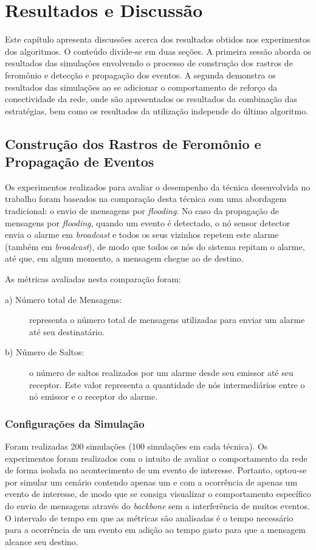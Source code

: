 \chapter{Resultados e Discussão}
Este capítulo apresenta discussões acerca dos resultados obtidos nos experimentos dos algoritmos. O conteúdo divide-se em duas seções. A primeira sessão aborda os resultados das simulações envolvendo o processo de construção dos rastros de feromônio e detecção e propagação dos eventos. A segunda demonstra os resultados das simulações ao se adicionar o comportamento de reforço da conectividade da rede, onde são apresentados os resultados da combinação das estratégias, bem como os resultados da utilização independe do último algoritmo.

\section{Construção dos Rastros de Feromônio e Propagação de Eventos}
Os experimentos realizados para avaliar o desempenho da técnica desenvolvida no trabalho foram baseados na comparação desta técnica com uma abordagem tradicional: o envio de mensagens por \emph{flooding}. No caso da propagação de mensagens por \emph{flooding}, quando um evento é detectado, o nó sensor detector envia o alarme em \emph{broadcast} e todos os seus vizinhos repetem este alarme (também em \emph{broadcast}), de modo que todos os nós do sistema repitam o alarme, até que, em algum momento, a mensagem chegue ao \vant de destino.

As métricas avaliadas nesta comparação foram:

\begin{description}
\item[a) Número total de Mensagens: ] representa o número total de mensagens utilizadas para enviar um alarme até seu destinatário.
\item[b) Número de Saltos:] o número de saltos realizados por um alarme desde seu emissor até seu receptor. Este valor representa a quantidade de nós intermediários entre o nó emissor e o \vant receptor do alarme.
\end{description}

\subsection{Configurações da Simulação}
Foram realizadas 200 simulações (100 simulações em cada técnica). Os experimentos foram realizados com o intuito de avaliar o comportamento da rede de forma isolada no acontecimento de um evento de interesse. Portanto, optou-se por simular um cenário contendo apenas um \vant e com a ocorrência de apenas um evento de interesse, de modo que se consiga visualizar o comportamento específico do envio de mensagens através do \emph{backbone} sem a interferência de muitos eventos. O intervalo de tempo em que as métricas são analisadas é o tempo necessário para a ocorrência de um evento em adição ao tempo gasto para que a mensagem alcance seu destino.

